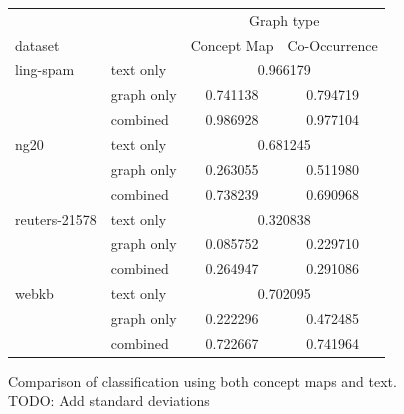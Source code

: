 \begin{figure}[ht]
\centering
\begin{tabular}{llcc}
  &  & \multicolumn{2}{c}{Graph type} \\
   dataset   & &  Concept Map &  Co-Occurrence \\
\midrule
ling-spam 
          & text only & \multicolumn{2}{c}{ 0.966179 }\\
          & graph only &  0.741138 &  0.794719\\
          & combined &  0.986928 &  0.977104\\
\midrule
ng20 
          & text only & \multicolumn{2}{c}{ 0.681245 }\\
          & graph only &  0.263055 &  0.511980\\
          & combined &  0.738239 &  0.690968\\
\midrule
reuters-21578 
          & text only & \multicolumn{2}{c}{ 0.320838 }\\
          & graph only &  0.085752 &  0.229710\\
          & combined &  0.264947 &  0.291086\\
\midrule
webkb 
          & text only & \multicolumn{2}{c}{ 0.702095 }\\
          & graph only &  0.222296 &  0.472485\\
          & combined &  0.722667 &  0.741964\\
\bottomrule
\end{tabular}
\caption{Comparison of classification using both concept maps and text. TODO: Add standard deviations}
\end{figure}

